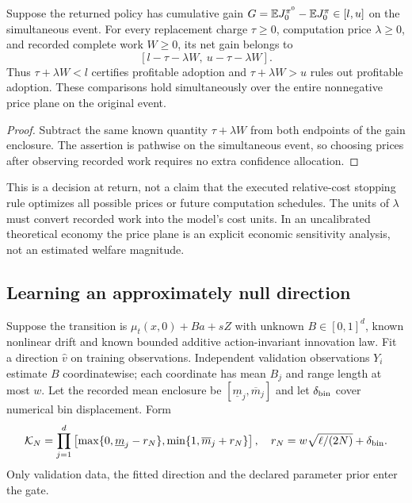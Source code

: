 \begin{corollary}\label{cor:adoption56}
Suppose the returned policy has cumulative gain $G=\mathbb E J_0^{\pi^0}-\mathbb E J_0^\pi\in[l,u]$ on the simultaneous event. For every replacement charge $\tau\ge0$, computation price $\lambda\ge0$, and recorded complete work $W\ge0$, its net gain belongs to
\[
 [l-\tau-\lambda W,\ u-\tau-\lambda W].
\]
Thus $\tau+\lambda W<l$ certifies profitable adoption and $\tau+\lambda W>u$ rules out profitable adoption. These comparisons hold simultaneously over the entire nonnegative price plane on the original event.
\end{corollary}
\begin{proof}
Subtract the same known quantity $\tau+\lambda W$ from both endpoints of the gain enclosure. The assertion is pathwise on the simultaneous event, so choosing prices after observing recorded work requires no extra confidence allocation.
\end{proof}

This is a decision at return, not a claim that the executed relative-cost stopping rule optimizes all possible prices or future computation schedules. The units of $\lambda$ must convert recorded work into the model's cost units. In an uncalibrated theoretical economy the price plane is an explicit economic sensitivity analysis, not an estimated welfare magnitude.

\subsection{Learning an approximately null direction}
Suppose the transition is $\mu_t(x,0)+Ba+sZ$ with unknown $B\in[0,1]^d$, known nonlinear drift and known bounded additive action-invariant innovation law. Fit a direction $\widehat v$ on training observations. Independent validation observations $Y_i$ estimate $B$ coordinatewise; each coordinate has mean $B_j$ and range length at most $w$. Let the recorded mean enclosure be $[\underline m_j,\overline m_j]$ and let $\delta_{\rm bin}$ cover numerical bin displacement. Form
\begin{equation}\label{eq:confidencebox56}
 \mathcal K_N=\prod_{j=1}^d
 \left[\max\{0,\underline m_j-r_N\},\min\{1,\overline m_j+r_N\}\right],
 \quad r_N=w\sqrt{\ell/(2N)}+\delta_{\rm bin}.
\end{equation}
Only validation data, the fitted direction and the declared parameter prior enter the gate.

